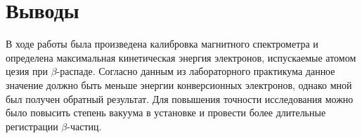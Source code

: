 \documentclass[14pt, a4paper]{report}
\begin{document}
\section{Выводы}

В ходе работы была произведена калибровка магнитного спектрометра и определена максимальная кинетическая энергия электронов, испускаемые атомом цезия при $\beta$-распаде. Согласно данным из лабораторного практикума данное значение должно быть меньше энергии конверсионных электронов, однако мной был получен обратный результат. Для повышения точности исследования можно было повысить степень вакуума в установке и провести более длительные регистрации $\beta$-частиц.
\end{document}
